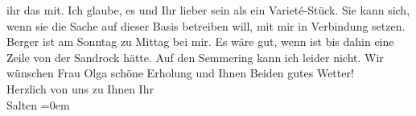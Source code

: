 \begin{ledgroupsized}[t]{13cm}
               ihr das mit. Ich glaube, es und Ihr lieber sein als ein Varieté-Stück. Sie kann sich,
               wenn sie die Sache auf dieser Basis betreiben will, mit mir in Verbindung setzen. Berger ist am Sonntag zu Mittag bei mir. Es wäre gut,
               wenn ist bis dahin eine Zeile von der Sandrock hätte.
               Auf den Semmering kann ich leider nicht. Wir wünschen
               Frau Olga schöne Erholung und Ihnen Beiden gutes
               Wetter! {\\}Herzlich von uns zu Ihnen\pend
           \pstart
           Ihr
               {\\[\baselineskip]}Salten\pend
           \leftskip=0em{}
         
         \endnumbering{}\end{ledgroupsized}\begin{anhang}\end{anhang}\newcommand{\dateiname}{L03552}\newcommand{\titel}{Felix Salten an Arthur Schnitzler, 14. 10. 1910}\newcommand{\editorInnen}{Martin Anton Müller und Laura Untner}
      